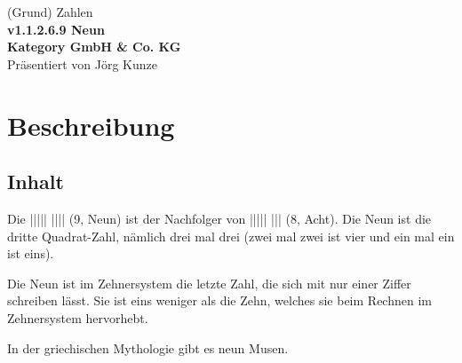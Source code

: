 \documentclass[a4paper]{amsart}
\theoremstyle{definition}
\begin{document}
\begin{titlepage}
\centering
{\huge
(Grund) Zahlen\\[1cm]
\textbf{v1.1.2.6.9 Neun}
}\\[1cm]

\textbf{Kategory GmbH \& Co. KG}\\
Präsentiert von Jörg Kunze

\end{titlepage}

%

\newpage

\section*{Beschreibung}

\subsection*{Inhalt}
Die ||||| |||| (9, Neun) ist der Nachfolger von ||||| ||| (8, Acht). Die Neun ist die dritte Quadrat-Zahl, nämlich drei mal drei (zwei mal zwei ist vier und ein mal ein ist eins). 

Die Neun ist im Zehnersystem die letzte Zahl, die sich mit nur einer Ziffer schreiben lässt. Sie ist eins weniger als die Zehn, welches sie beim Rechnen im Zehnersystem hervorhebt.

In der griechischen Mythologie gibt es neun Musen.
\end{document}
